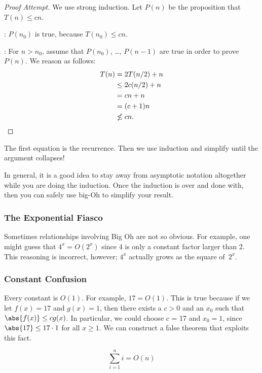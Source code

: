 \begin{editingnotes}
\begin{proof}[Proof Attempt]
We use strong induction.  Let $P(n)$ be the proposition that $T(n) \le
cn$.

:
$P(n_0)$ is true, because $T(n_0) \le cn$.

:
For $n > n_0$, assume that $P(n_0)$, \dots, $P(n - 1)$ are true in
order to prove~$P(n)$.  We reason as follows:
\begin{align*}
T(n)   &=  2 T(n/2) + n \\
      &\le 2 c(n/2) + n \\
      &=  cn + n \\
      &=  (c + 1) n \\
      &\nleq c n.  \qedhere
\end{align*}
\end{proof}

The first equation is the recurrence.  Then we use induction and
simplify until the argument collapses!

In general, it is a good idea to stay away from asymptotic notation
altogether while you are doing the induction.  Once the induction is
over and done with, then you can safely use big-Oh to simplify your
result.
\end{editingnotes}

\subsubsection{The Exponential Fiasco}

Sometimes relationships involving Big Oh are not so obvious.  For
example, one might guess that $4^x = O(2^x)$ since 4 is only a
constant factor larger than 2.  This reasoning is incorrect, however;
$4^x$ actually grows as the square of~$2^x$.

\subsubsection{Constant Confusion}

Every constant is $O(1)$.  For example, $17 = O(1)$.  This is true because
if we let $f(x) = 17$ and $g(x) = 1$, then there exists a $c > 0$ and an
$x_0$ such that $\abs{f(x)} \leq c g(x)$.  In particular, we could choose
$c$ = 17 and $x_0 = 1$, since $\abs{17} \leq 17 \cdot 1$ for all $x \geq
1$.  We can construct a false theorem that exploits this fact.

\begin{falsethm}
\[
\sum_{i=1}^n i = O(n)
\]
\end{falsethm}

